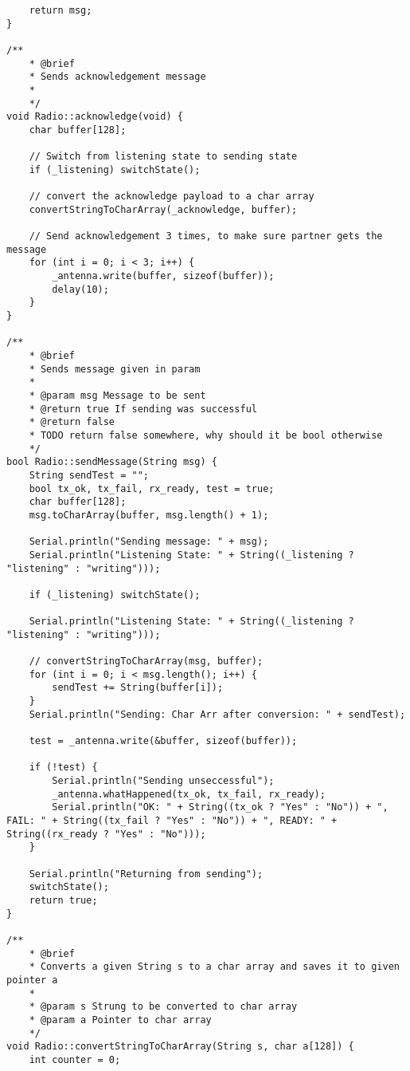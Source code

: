 \documentclass[a4paper, 11pt]{scrartcl}
\begin{document}
\begin{lstlisting}
    return msg;
}

/**
    * @brief 
    * Sends acknowledgement message
    * 
    */
void Radio::acknowledge(void) {
    char buffer[128];

    // Switch from listening state to sending state
    if (_listening) switchState();

    // convert the acknowledge payload to a char array
    convertStringToCharArray(_acknowledge, buffer);

    // Send acknowledgement 3 times, to make sure partner gets the message
    for (int i = 0; i < 3; i++) {
        _antenna.write(buffer, sizeof(buffer));
        delay(10);
    }
}

/**
    * @brief 
    * Sends message given in param
    * 
    * @param msg Message to be sent
    * @return true If sending was successful
    * @return false
    * TODO return false somewhere, why should it be bool otherwise
    */
bool Radio::sendMessage(String msg) {
    String sendTest = "";
    bool tx_ok, tx_fail, rx_ready, test = true;
    char buffer[128];
    msg.toCharArray(buffer, msg.length() + 1);
    
    Serial.println("Sending message: " + msg);
    Serial.println("Listening State: " + String((_listening ? "listening" : "writing")));

    if (_listening) switchState();
    
    Serial.println("Listening State: " + String((_listening ? "listening" : "writing")));

    // convertStringToCharArray(msg, buffer);
    for (int i = 0; i < msg.length(); i++) {
        sendTest += String(buffer[i]);
    }
    Serial.println("Sending: Char Arr after conversion: " + sendTest);
    
    test = _antenna.write(&buffer, sizeof(buffer));

    if (!test) {
        Serial.println("Sending unseccessful");
        _antenna.whatHappened(tx_ok, tx_fail, rx_ready);
        Serial.println("OK: " + String((tx_ok ? "Yes" : "No")) + ", FAIL: " + String((tx_fail ? "Yes" : "No")) + ", READY: " + String((rx_ready ? "Yes" : "No")));
    }

    Serial.println("Returning from sending");
    switchState();
    return true;
}

/**
    * @brief
    * Converts a given String s to a char array and saves it to given pointer a
    * 
    * @param s Strung to be converted to char array
    * @param a Pointer to char array
    */
void Radio::convertStringToCharArray(String s, char a[128]) {
    int counter = 0;


\end{lstlisting}
\end{document}
